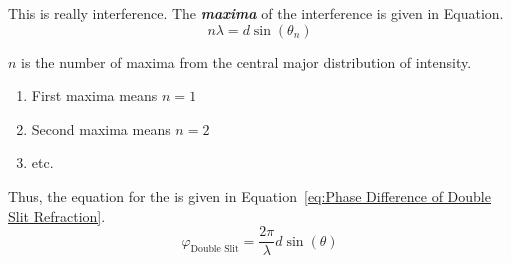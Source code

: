 		\begin{definition} \label{def:Double Slit Diffraction}
			This is really interference.
			The \emph{\textbf{maxima}} of the interference is given in Equation.
			\begin{equation} \label{eq:Maxima of Double Slit Diffraction}
				n \lambda = d \sin \left( \theta_{n} \right)
			\end{equation}
			\begin{note}
				$n$ is the number of maxima from the central major distribution of intensity.
				\begin{enumerate}
					\item First maxima means $n=1$
					\item Second maxima means $n=2$
					\item etc.
				\end{enumerate}
			\end{note}
			Thus, the equation for the  is given in Equation~\eqref{eq:Phase Difference of Double Slit Refraction}.
			\begin{equation} \label{eq:Phase Difference of Double Slit Refraction}
				\varphi_{\text{Double Slit}} = \frac{2 \pi}{\lambda} d \sin \left( \theta \right)
			\end{equation}
		\end{definition}